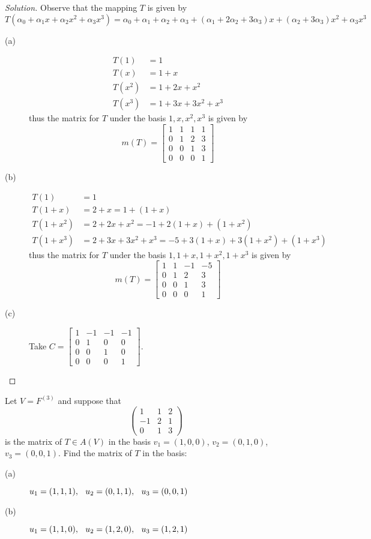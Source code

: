 \documentclass[12pt,leqno]{article}
\numberwithin{equation}{section}
\newcommand{\question}[2] {\vspace{.25in} \noindent\fbox{#1} #2 \vspace{.10in}}
\theoremstyle{definition}
\begin{document}
\begin{proof}[Solution]
Observe that the mapping $T$ is given by \[T(\alpha_0+\alpha_1x+\alpha_2x^2+\alpha_3x^3)=\alpha_0+\alpha_1+\alpha_2+\alpha_3+(\alpha_1+2\alpha_2+3\alpha_3)x+(\alpha_2+3\alpha_3)x^2+\alpha_3x^3\]
 \begin{description}
  \item [(a)] \begin{align*}T(1)&=1\\T(x)&=1+x\\T(x^2)&=1+2x+x^2\\T(x^3)&=1+3x+3x^2+x^3\end{align*} thus the matrix for $T$ under the basis $1,x,x^2,x^3$ is given by \[m(T)=\begin{bmatrix}1&1&1&1\\0&1&2&3\\0&0&1&3\\0&0&0&1\end{bmatrix}\]
  \item [(b)] \begin{align*}T(1)&=1\\T(1+x)&=2+x=1+(1+x)\\T(1+x^2)&=2+2x+x^2=-1+2(1+x)+(1+x^2)\\T(1+x^3)&=2+3x+3x^2+x^3=-5+3(1+x)+3(1+x^2)+(1+x^3)\end{align*} thus the matrix for $T$ under the basis $1,1+x,1+x^2,1+x^3$ is given by \[m(T)=\begin{bmatrix}1&1&-1&-5\\0&1&2&3\\0&0&1&3\\0&0&0&1\end{bmatrix}\]
  \item [(c)] Take $C=\begin{bmatrix}1&-1&-1&-1\\0&1&0&0\\0&0&1&0\\0&0&0&1\end{bmatrix}$.
 \end{description}

\end{proof}


\question{6}{Let $V=F^{(3)}$ and suppose that \[\begin{pmatrix}1&1&2\\-1&2&1\\0&1&3\end{pmatrix}\] is the matrix of $T\in A(V)$ in the basis $v_1=(1,0,0)$, $v_2=(0,1,0)$, $v_3=(0,0,1)$. Find the matrix of $T$ in the basis:}
\begin{description}
 \item [(a)] $u_1=(1,1,1),\hskip.1in u_2=(0,1,1),\hskip.1in u_3=(0,0,1)$
 \item [(b)] $u_1=(1,1,0),\hskip.1in u_2=(1,2,0),\hskip.1in u_3=(1,2,1)$
\end{description}
\end{document}

